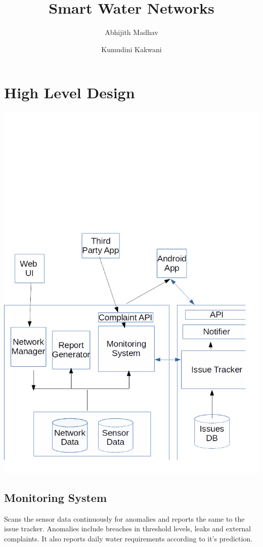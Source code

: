 \documentclass[12pt]{article}
\begin{document}
\title{Smart Water Networks}
\author{Abhijith Madhav \and Kumudini Kakwani}
\maketitle

\section*{High Level Design}
\includegraphics[scale=0.4]{HLD.png}
\subsection*{Monitoring System}
Scans the sensor data continuously for anomalies and reports the same to the issue tracker. Anomalies include breaches in threshold levels, leaks and external complaints. It also reports daily water requirements according to it's prediction.
\end{document}
